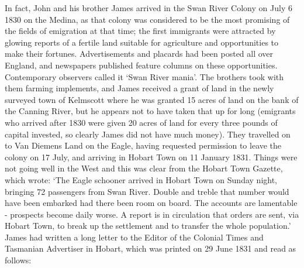 In fact, John and his brother James arrived in the Swan River Colony on July 6 1830 on the Medina, as that colony was considered to be the most promising of the fields of emigration at that time; the first immigrants  were attracted by glowing reports of a fertile land suitable for agriculture and opportunities to make their fortunes. Advertisements and placards had been posted all over England, and newspapers published feature columns on these opportunities. Contemporary observers called it `Swan River mania'. The brothers took with them farming implements, and James received a grant of land in the newly surveyed town of Kelmscott where he was granted 15 acres of land on the bank of the Canning River, but he appears not to have taken that up for long (emigrants who arrived after 1830 were given 20 acres of land for every three pounds of capital invested, so clearly James did not have much money). They travelled on to Van Diemens Land on the Eagle, having requested permission to leave the colony on 17 July, and arriving in Hobart Town on 11 January 1831. Things were not going well in the West and this was clear from the Hobart Town Gazette, which wrote: `The Eagle schooner arrived in Hobart Town on Sunday night, bringing 72 passengers from Swan River. Double and treble that number would have been embarked had there been room on board. The accounts are lamentable - prospects become daily worse. A report is in circulation that orders are sent, via Hobart Town, to break up the settlement and to transfer the whole population.'  James had written a long letter to the Editor of the Colonial Times and Tasmanian Advertiser in Hobart, which was printed on 29 June 1831 and read as follows: 

